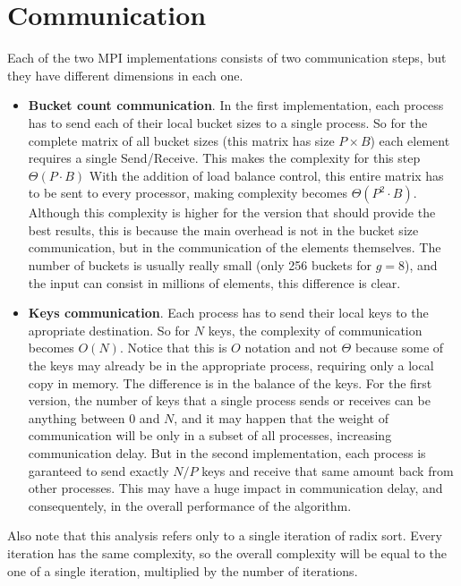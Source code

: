 \section{Communication}
\label{sec:comm}

Each of the two MPI implementations consists of two communication steps, but they have different dimensions in each one.

\begin{itemize}
	\item \textbf{Bucket count communication}. In the first implementation, each process has to send each of their local bucket sizes to a single process. So for the complete matrix of all bucket sizes (this matrix has size $P \times B$) each element requires a single Send/Receive. This makes the complexity for this step $\Theta(P \cdot B)$
		With the addition of load balance control, this entire matrix has to be sent to every processor, making complexity becomes $\Theta(P^2 \cdot B)$. Although this complexity is higher for the version that should provide the best results, this is because the main overhead is not in the bucket size communication, but in the communication of the elements themselves. The number of buckets is usually really small (only 256 buckets for $g=8$), and the input can consist in millions of elements, this difference is clear.

	\item \textbf{Keys communication}. Each process has to send their local keys to the apropriate destination. So for $N$ keys, the complexity of communication becomes $O(N)$. Notice that this is $O$ notation and not $\Theta$ because some of the keys may already be in the appropriate process, requiring only a local copy in memory. The difference is in the balance of the keys. For the first version, the number of keys that a single process sends or receives can be anything between 0 and $N$, and it may happen that the weight of communication will be only in a subset of all processes, increasing communication delay. But in the second implementation, each process is garanteed to send exactly $N/P$ keys and receive that same amount back from other processes. This may have a huge impact in communication delay, and consequentely, in the overall performance of the algorithm.

\end{itemize}

Also note that this analysis refers only to a single iteration of radix sort. Every iteration has the same complexity, so the overall complexity will be equal to the one of a single iteration, multiplied by the number of iterations.
